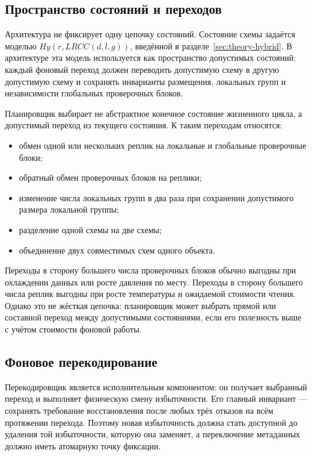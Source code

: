 \SlotPlacementArtifacts

\subsection{Пространство состояний и переходов}

Архитектура не фиксирует одну цепочку состояний. Состояние схемы задаётся
моделью \(Hy(r, LRCC(d,l,g))\), введённой в разделе~\ref{sec:theory-hybrid}.
В архитектуре эта модель используется как пространство допустимых состояний:
каждый фоновый переход должен переводить допустимую схему в другую допустимую
схему и сохранять инварианты размещения, локальных групп и независимости
глобальных проверочных блоков.

Планировщик выбирает не абстрактное конечное состояние жизненного цикла, а
допустимый переход из текущего состояния. К таким переходам относятся:
\begin{itemize}
    \item обмен одной или нескольких реплик на локальные и глобальные
    проверочные блоки;
    \item обратный обмен проверочных блоков на реплики;
    \item изменение числа локальных групп в два раза при сохранении допустимого
    размера локальной группы;
    \item разделение одной схемы на две схемы;
    \item объединение двух совместимых схем одного объекта.
\end{itemize}

Переходы в сторону большего числа проверочных блоков обычно выгодны при
охлаждении данных или росте давления по месту. Переходы в сторону большего
числа реплик выгодны при росте температуры и ожидаемой стоимости чтения.
Однако это не жёсткая цепочка: планировщик может выбрать прямой или составной
переход между допустимыми состояниями, если его полезность выше с учётом
стоимости фоновой работы.

\TransitionGraphArtifact

\subsection{Фоновое перекодирование}

Перекодировщик является исполнительным компонентом: он получает выбранный
переход и выполняет физическую смену избыточности. Его главный инвариант ---
сохранять требование восстановления после любых трёх отказов на всём протяжении
перехода. Поэтому новая избыточность должна стать доступной до удаления той
избыточности, которую она заменяет, а переключение метаданных должно иметь
атомарную точку фиксации.

